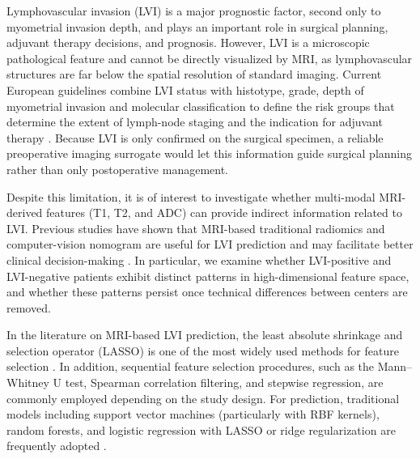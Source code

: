 \documentclass[conference]{IEEEtran}
\begin{document}
Lymphovascular invasion (LVI) is a major prognostic factor, second only to myometrial invasion depth, and plays an important role in surgical planning, adjuvant therapy decisions, and prognosis. However, LVI is a microscopic pathological feature and cannot be directly visualized by MRI, as lymphovascular structures are far below the spatial resolution of standard imaging.
Current European guidelines combine LVI status with histotype, grade, depth of myometrial invasion and molecular classification to define the risk groups that determine the extent of lymph-node staging and the indication for adjuvant therapy \cite{concin2021esgo}. Because LVI is only confirmed on the surgical specimen, a reliable preoperative imaging surrogate would let this information guide surgical planning rather than only postoperative management.

Despite this limitation, it is of interest to investigate whether multi-modal MRI-derived features (T1, T2, and ADC) can provide indirect information related to LVI. Previous studies have shown that MRI-based traditional radiomics and computer-vision nomogram are useful for LVI prediction and may facilitate better clinical decision-making \cite{long2021mri}. In particular, we examine whether LVI-positive and LVI-negative patients exhibit distinct patterns in high-dimensional feature space, and whether these patterns persist once technical differences between centers are removed.

In the literature on MRI-based LVI prediction, the least absolute shrinkage and selection operator (LASSO) is one of the most widely used methods for feature selection \cite{liu2024multimodal} \cite{luo2020multiparametric}. In addition, sequential feature selection procedures, such as the Mann–Whitney U test, Spearman correlation filtering, and stepwise regression, are commonly employed depending on the study design. For prediction, traditional models including support vector machines (particularly with RBF kernels), random forests, and logistic regression with LASSO or ridge regularization are frequently adopted \cite{liu2024multimodal} \cite{huang2022multi}.
\end{document}
